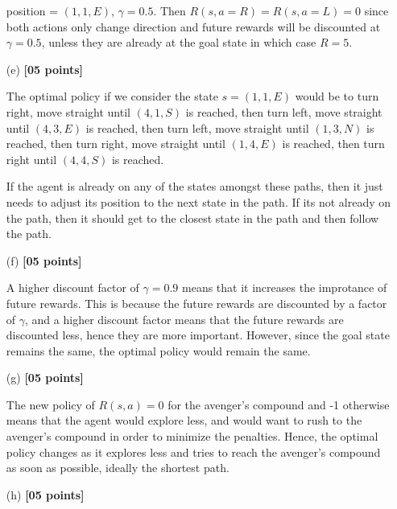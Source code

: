 \begin{solution}
\begin{enumerate}
    position = $ (1, 1, E) $, $ \gamma = 0.5 $. Then $ R(s, a = R) = R(s, a = L) = 0 $ since both actions only change direction and future rewards will be discounted at $\gamma = 0.5$, unless they are already at the goal state in which case $R = 5$.

    \item[(e)] \textbf{[05 points]}
    

    The optimal policy if we consider the state $ s = (1, 1, E) $ would be to turn right, move straight until $ (4, 1, S) $ is reached, then turn left, move straight until $ (4, 3, E) $ is reached, then turn left, move straight until $ (1, 3, N) $ is reached, then turn right, move straight until $ (1, 4, E) $ is reached, then turn right until $ (4, 4, S) $ is reached.

    If the agent is already on any of the states amongst these paths, then it just needs to adjust its position to the next state in the path. If its not already on the path, then it should get to the closest state in the path and then follow the path.

    \item[(f)] \textbf{[05 points]}

    A higher discount factor of $ \gamma = 0.9 $ means that it increases the improtance of future rewards. This is because the future rewards are discounted by a factor of $ \gamma $, and a higher discount factor means that the future rewards are discounted less, hence they are more important. However, since the goal state remains the same, the optimal policy would remain the same.

    \item[(g)] \textbf{[05 points]}
    
    The new policy of $ R(s, a) = 0 $ for the avenger's compound and -1 otherwise means that the agent would explore less, and would want to rush to the avenger's compound in order to minimize the penalties. Hence, the optimal policy changes as it explores less and tries to reach the avenger's compound as soon as possible, ideally the shortest path.

    \item[(h)] \textbf{[05 points]}
    

\end{enumerate}
\end{solution}
